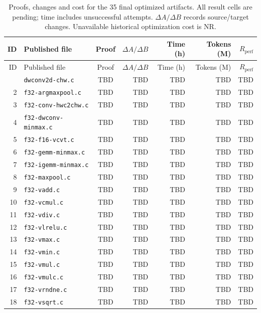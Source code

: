 {\scriptsize
\setlength{\tabcolsep}{5pt}
\renewcommand{\arraystretch}{1.17}
\begin{longtable}{@{}rlcrrrr@{}}
\caption{Proofs, changes and cost for the 35 final optimized artifacts. All result cells are pending; time includes unsuccessful attempts. $\Delta A/\Delta B$ records source/target changes. Unavailable historical optimization cost is NR.}\label{tab:kernels}\\
\toprule
ID & Published file & Proof & $\Delta A/\Delta B$ & Time (h) & Tokens (M) & $R_{\mathrm{perf}}$ \\
\midrule
\endfirsthead
\toprule
ID & Published file & Proof & $\Delta A/\Delta B$ & Time (h) & Tokens (M) & $R_{\mathrm{perf}}$ \\
\midrule
\endhead
\bottomrule
\endfoot
1 & \texttt{dwconv2d-chw.c} & TBD & TBD & TBD & TBD & TBD \\
2 & \texttt{f32-argmaxpool.c} & TBD & TBD & TBD & TBD & TBD \\
3 & \texttt{f32-conv-hwc2chw.c} & TBD & TBD & TBD & TBD & TBD \\
4 & \texttt{f32-dwconv-minmax.c} & TBD & TBD & TBD & TBD & TBD \\
5 & \texttt{f32-f16-vcvt.c} & TBD & TBD & TBD & TBD & TBD \\
6 & \texttt{f32-gemm-minmax.c} & TBD & TBD & TBD & TBD & TBD \\
7 & \texttt{f32-igemm-minmax.c} & TBD & TBD & TBD & TBD & TBD \\
8 & \texttt{f32-maxpool.c} & TBD & TBD & TBD & TBD & TBD \\
9 & \texttt{f32-vadd.c} & TBD & TBD & TBD & TBD & TBD \\
10 & \texttt{f32-vcmul.c} & TBD & TBD & TBD & TBD & TBD \\
11 & \texttt{f32-vdiv.c} & TBD & TBD & TBD & TBD & TBD \\
12 & \texttt{f32-vlrelu.c} & TBD & TBD & TBD & TBD & TBD \\
13 & \texttt{f32-vmax.c} & TBD & TBD & TBD & TBD & TBD \\
14 & \texttt{f32-vmin.c} & TBD & TBD & TBD & TBD & TBD \\
15 & \texttt{f32-vmul.c} & TBD & TBD & TBD & TBD & TBD \\
16 & \texttt{f32-vmulc.c} & TBD & TBD & TBD & TBD & TBD \\
17 & \texttt{f32-vrndne.c} & TBD & TBD & TBD & TBD & TBD \\
18 & \texttt{f32-vsqrt.c} & TBD & TBD & TBD & TBD & TBD \\

\end{longtable}}
